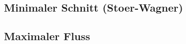%


%


%



%


%


%


\subsection{Minimaler Schnitt (Stoer-Wagner)}


\subsection{Maximaler Fluss}


